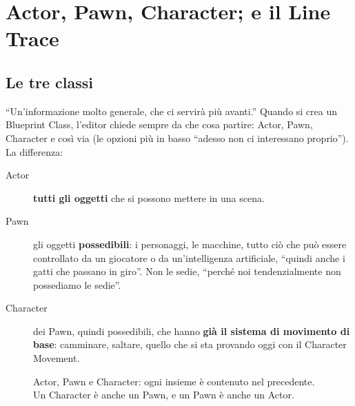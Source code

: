 \section{Actor, Pawn, Character; e il Line Trace}
\label{gd7:sec:classi}

\subsection{Le tre classi}

``Un'informazione molto generale, che ci servirà più avanti.'' Quando si crea
un Blueprint Class, l'editor chiede sempre da che cosa partire: Actor, Pawn,
Character e così via (le opzioni più in basso ``adesso non ci interessano
proprio''). La differenza:
\begin{description}
  \item[Actor] \textbf{tutti gli oggetti} che si possono mettere in una scena.
  \item[Pawn] gli oggetti \textbf{possedibili}: i personaggi, le macchine,
        tutto ciò che può essere controllato da un giocatore o da
        un'intelligenza artificiale, ``quindi anche i gatti che passano in
        giro''. Non le sedie, ``perché noi tendenzialmente non possediamo le
        sedie''.
  \item[Character] dei Pawn, quindi possedibili, che hanno \textbf{già il
        sistema di movimento di base}: camminare, saltare, quello che si sta
        provando oggi con il Character Movement.
\end{description}

\begin{figure}[htbp]
\centering
{}
\caption{Actor, Pawn e Character: ogni insieme è contenuto nel precedente. Un
Character è anche un Pawn, e un Pawn è anche un Actor.}
\label{gd7:fig:classi}
\end{figure}

